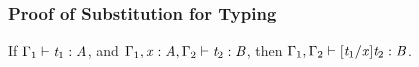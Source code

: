 \subsubsection{Proof of Substitution for Typing}
\label{sec:proof_of_lemma:substitution_for_typing}

\begin{lemma*}
  If $\Gamma_{{\mathrm{1}}}  \vdash  \mathit{t_{{\mathrm{1}}}}  :  \mathit{A}$, and $\Gamma_{{\mathrm{1}}}  ,  \mathit{x}  :  \mathit{A}  ,  \Gamma_{{\mathrm{2}}}  \vdash  \mathit{t_{{\mathrm{2}}}}  :  \mathit{B}$, then $\Gamma_{{\mathrm{1}}}  ,  \Gamma_{{\mathrm{2}}}  \vdash  [  \mathit{t_{{\mathrm{1}}}}  /  \mathit{x}  ]  \mathit{t_{{\mathrm{2}}}}  :  \mathit{B}$.
\end{lemma*}

